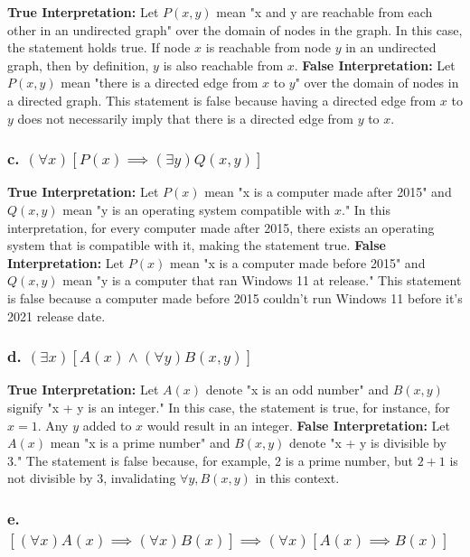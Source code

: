 \documentclass[12pt]{article}
\begin{document}
\textbf{True Interpretation:} Let \(P(x, y)\) mean "x and y are reachable from each other in an undirected graph" over the domain of nodes in the graph. In this case, the statement holds true. If node \(x\) is reachable from node \(y\) in an undirected graph, then by definition, \(y\) is also reachable from \(x\).
\newline
\textbf{False Interpretation:} Let \(P(x, y)\) mean "there is a directed edge from \(x\) to \(y\)" over the domain of nodes in a directed graph. This statement is false because having a directed edge from \(x\) to \(y\) does not necessarily imply that there is a directed edge from \(y\) to \(x\).

\subsubsection*{c. \((\forall x)[P(x) \implies (\exists y)Q(x, y)]\)}

\textbf{True Interpretation:} Let \(P(x)\) mean "x is a computer made after 2015" and \(Q(x, y)\) mean "y is an operating system compatible with \(x\)." In this interpretation, for every computer made after 2015, there exists an operating system that is compatible with it, making the statement true.
\newline
\textbf{False Interpretation:} Let \(P(x)\) mean "x is a computer made before 2015" and \(Q(x,y)\) mean "y is a computer that ran Windows 11 at release." This statement is false because a computer made before 2015 couldn't run Windows 11 before it's 2021 release date.


\subsubsection*{d. \((\exists x)[A(x) \land (\forall y)B(x, y)]\)}

\textbf{True Interpretation:}
Let \(A(x)\) denote "x is an odd number" and \(B(x, y)\) signify "x + y is an integer." In this case, the statement is true, for instance, for \(x=1\). Any \(y\) added to \(x\) would result in an integer.
\newline
\textbf{False Interpretation:}
Let \(A(x)\) mean "x is a prime number" and \(B(x, y)\) denote "x + y is divisible by 3." The statement is false because, for example, 2 is a prime number, but \(2 + 1\) is not divisible by 3, invalidating \(\forall y, B(x, y)\) in this context.


\subsubsection*{e. \([( \forall x)A(x) \implies (\forall x)B(x)] \implies (\forall x)[A(x) \implies B(x)]\)}
\end{document}
